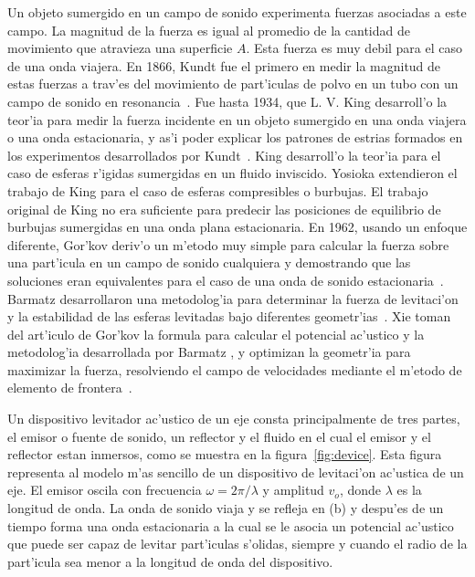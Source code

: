 Un objeto sumergido en un campo de sonido experimenta fuerzas asociadas a 
este campo. La magnitud de la fuerza es igual al promedio de la cantidad
de movimiento que atravieza una superficie  $A$. Esta fuerza es
muy debil para el caso de una onda viajera. En 1866, Kundt fue el
primero en medir la magnitud de estas fuerzas a trav'es del movimiento
de part'iculas de polvo en un tubo con un campo de sonido en resonancia~\cite{kundt1866}.
Fue hasta 1934, que L. V. King desarroll'o la teor'ia para medir la
fuerza incidente en un objeto sumergido en una onda viajera o una onda estacionaria,
y as'i poder explicar  los patrones de estrias formados en los experimentos
desarrollados por Kundt~\cite{king34}. King desarroll'o la teor'ia para el caso
de esferas r'igidas sumergidas en un fluido inviscido. Yosioka \etal extendieron
el trabajo de King para el caso de esferas compresibles o burbujas. El trabajo 
original de King no era suficiente para predecir las posiciones de equilibrio
de burbujas sumergidas en una onda plana estacionaria. En 1962, usando un enfoque
diferente, Gor'kov deriv'o un m'etodo muy simple para calcular la fuerza sobre una
part'icula en un campo de sonido cualquiera y demostrando que las soluciones eran
equivalentes para el caso de una onda de sonido estacionaria~\cite{gorkov62}.
Barmatz \etal desarrollaron una metodolog'ia para determinar la fuerza de levitaci'on
y la estabilidad de las esferas levitadas bajo diferentes geometr'ias~\cite{barmatz84}. 
Xie \etal toman del art'iculo de Gor'kov la formula para calcular el potencial ac'ustico
y la metodolog'ia desarrollada por Barmatz \etal, y optimizan la geometr'ia para maximizar
la fuerza, resolviendo el campo de velocidades mediante el m'etodo de elemento de frontera~\cite{xie}.

Un dispositivo levitador ac'ustico de un eje consta principalmente de tres partes,
el emisor o fuente de sonido, un reflector y el fluido en el cual el emisor y el
reflector estan inmersos, como se muestra en la figura~\ref{fig:device}. Esta figura
representa al modelo m'as sencillo de un dispositivo de levitaci'on ac'ustica de un eje. El
emisor oscila con frecuencia $\omega=2\pi/\lambda$ y amplitud $v_o$, donde $\lambda$ es la
longitud de onda. La onda de sonido viaja y se refleja en (b) y despu'es de un tiempo forma
una onda estacionaria a la cual se le asocia un potencial ac'ustico que puede ser capaz de levitar
part'iculas s'olidas, siempre y cuando el radio de la part'icula sea menor a la longitud de
onda del dispositivo.
 
